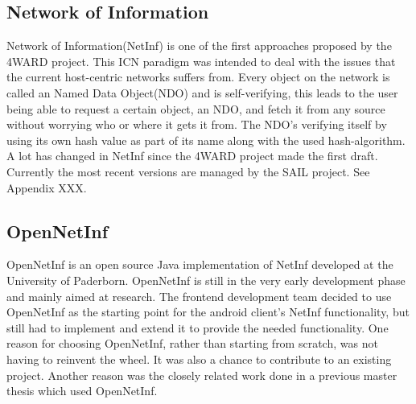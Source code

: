 \subsection{Network of Information}
Network of Information(NetInf) is one of the first approaches proposed by the 4WARD project. \cite{4ward} This ICN paradigm was intended to deal with the issues that the current host-centric networks suffers from. Every object on the network is called an Named Data Object(NDO) and is self-verifying, this leads to the user being able to request a certain object, an NDO, and fetch it from any source without worrying who or where it gets it from. The NDO's verifying itself by using its own hash value as part of its name along with the used hash-algorithm.
A lot has changed in NetInf since the 4WARD project made the first draft. Currently the most recent versions are managed by the SAIL project. See Appendix XXX.

\subsection{OpenNetInf}
OpenNetInf \cite{opennetinf} is an open source Java implementation of NetInf  developed at the University of Paderborn. OpenNetInf is still in the very early development phase and mainly aimed at research. The frontend development team decided to use OpenNetInf as the starting point for the android client's NetInf functionality, but still had to implement and extend it to provide the needed functionality. One reason for choosing OpenNetInf, rather than starting from scratch, was not having to reinvent the wheel. It was also a chance to contribute to an existing project. Another reason was the closely related work done in a previous master thesis \cite{masterthesis} which used OpenNetInf.
